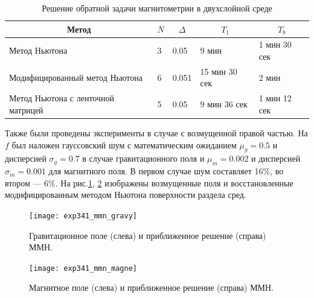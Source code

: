 \begin{table}[]
	\centering
	\caption{Решение обратной задачи магнитометрии в двухслойной среде}
	\label{table3.2}
	\begin{tabular}{|p{}|p{}|l|l|l|}
		\hline
		\multicolumn{1}{|c|}{Метод}        & \multicolumn{1}{c|}{$N$} &
		\multicolumn{1}{c|}{$\Delta$} &
		\multicolumn{1}{c|}{$T_1$} & \multicolumn{1}{c|}{$T_8$} \\ \hline
		Метод Ньютона                      &   3             & 0.05                  &     9 мин                   &      1 мин 30 сек                 \\ \hline
		Модифицированный метод Ньютона     &              6           & 0.051           & 15 мин 30 сек                & 2 мин                   \\ \hline
		Метод Ньютона с ленточной матрицей &   5                    & 0.05               & 9 мин 36 сек                & 1 мин 12 сек                 \\ \hline
	\end{tabular}
\end{table}

Также были проведены эксперименты в случае с возмущенной правой частью. На $f$ был наложен гауссовский шум с математическим ожиданием $\mu_g=0.5$ и дисперсией $\sigma_g=0.7$ в случае гравитационного поля и $\mu_m=0.002$ и дисперсией $\sigma_m=0.001$ для магнитного поля. В первом случае шум составляет 16\%, во втором --- 6\%. На рис.\ref{fig:exp341_mmn_gravy}, \ref{fig:exp341_mmn_magne} изображены возмущенные поля и восстановленные модифицированным методом Ньютона поверхности раздела сред.
\begin{figure}
	\centering
	\texttt{[image: exp341\_mmn\_gravy]}
	\caption{Гравитационное поле (слева) и приближенное решение (справа) ММН.}
	\label{fig:exp341_mmn_gravy}
\end{figure}
\begin{figure}
	\centering
	\texttt{[image: exp341\_mmn\_magne]}
	\caption{Магнитное поле (слева) и приближенное решение (справа) ММН.}
	\label{fig:exp341_mmn_magne}
\end{figure}

